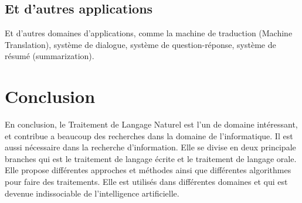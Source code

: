 \subsection*{Et d'autres applications}
Et d'autres domaines d'applications, comme la machine de traduction (Machine Translation), système de dialogue, système de question-réponse, système de résumé (summarization).

\section{Conclusion}
En conclusion, le Traitement de Langage Naturel est l'un de domaine intéressant, et contribue a beaucoup des recherches dans la domaine de l'informatique. Il est aussi nécessaire dans la recherche d'information. Elle se divise en deux principale branches qui est le traitement de langage écrite et le traitement de langage orale. Elle propose différentes approches et méthodes ainsi que différentes algorithmes pour faire des traitements. Elle est utilisés dans différentes domaines et qui est devenue indissociable de l'intelligence artificielle.